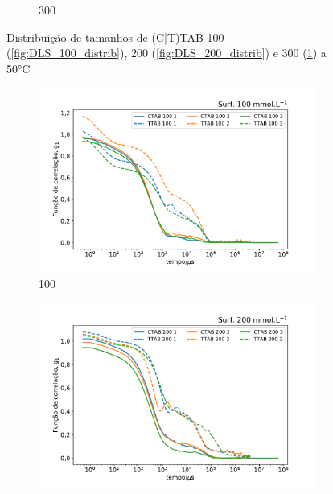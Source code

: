 \begin{figure}[h]
\begin{subfigure}{0.3\textwidth}
		\caption{300\mM}
		\label{fig:DLS_300_distrib}
	\end{subfigure}
	\caption{Distribuição de tamanhos de (C|T)TAB 100 (\ref{fig:DLS_100_distrib}), 200 (\ref{fig:DLS_200_distrib}) e 300 (\ref{fig:DLS_300_distrib}) \mM{} a 50°C}
	\label{fig:DLS_distrib_conc}
\end{figure}

\begin{figure}[h]
	\begin{subfigure}{0.3\textwidth}
		\centering
		\includegraphics[width=\textwidth]{imagens/dls/100_CC}
		\caption{100\mM}
		\label{fig:DLS_100_CC}
	\end{subfigure} %
	\begin{subfigure}{0.3\textwidth}
		\centering
		\includegraphics[width=\textwidth]{imagens/dls/200_CC}

\end{subfigure}
\end{figure}
